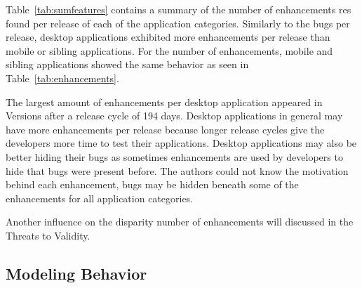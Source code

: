 \documentclass{acm_proc_article-sp}
\begin{document}
\begin{center}

\label{tab:enhancements}
\end{center}

Table~\ref{tab:sumfeatures} contains a summary of the number of enhancements res found per release of each of the application categories. 
Similarly to the bugs per release, desktop applications exhibited more enhancements per release than mobile or sibling applications.
For the number of enhancements, mobile and sibling applications showed the same behavior as seen in Table~\ref{tab:enhancements}.

The largest amount of enhancements per desktop application appeared in Versions after a release cycle of 194 days.
Desktop applications in general may have more enhancements per release because longer release cycles give the developers more time to test their applications.
Desktop applications may also be better hiding their bugs as sometimes enhancements are used by developers to hide that bugs were present before.
The authors could not know the motivation behind each enhancement, bugs may be hidden beneath some of the enhancements for all application categories.

Another influence on the disparity number of enhancements will discussed in the Threats to Validity.

\subsection{Modeling Behavior}



\begin{center}

\label{tab:mobileModel}
\end{center}

\begin{center}

\label{tab:desktopModel}
\end{center}

\begin{center}

\label{tab:sibModel}
\end{center}
\end{document}
